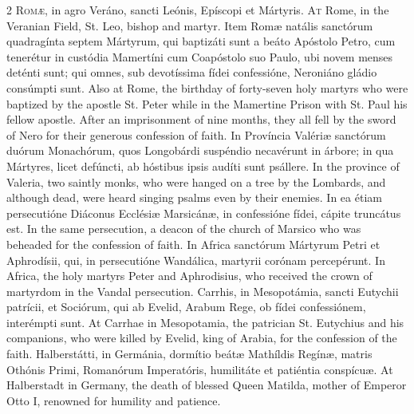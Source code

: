 \begin{paracol}{2}
\lettrine[lines=2]{R}{omæ,} in agro Veráno, sancti Leónis, Epíscopi 
 et Mártyris.
\switchcolumn
{}
\lettrine[lines=2]{A}{t} Rome, in the Veranian Field, St. Leo, bishop and martyr.
\switchcolumn*
{}
Item Romæ natális sanctórum quadragínta septem 
 Mártyrum, qui baptizáti sunt a beáto Apóstolo Petro, cum tenerétur in 
 custódia Mamertíni cum Coapóstolo suo Paulo, ubi novem menses deténti sunt; 
 qui omnes, sub devotíssima fídei confessióne, Neroniáno gládio consúmpti 
 sunt.
\switchcolumn
{}
Also at Rome, the birthday of forty-seven holy martyrs who were baptized by 
 the apostle St. Peter while in the Mamertine Prison with St. Paul his fellow 
 apostle. After an imprisonment of nine months, they all fell by the 
 sword of Nero for their generous confession of faith.
\switchcolumn*
{}
In Província Valériæ sanctórum duórum 
 Monachórum, quos Longobárdi suspéndio necavérunt in árbore; in qua Mártyres, 
 licet defúncti, ab hóstibus ipsis audíti sunt psállere.
\switchcolumn
{}
In the province of Valeria, two saintly monks, who were hanged on a tree by 
 the Lombards, and although dead, were heard singing psalms even by their 
 enemies.
\switchcolumn*
{}
In ea étiam persecutióne Diáconus Ecclésiæ 
 Marsicánæ, in confessióne fídei, cápite truncátus est.
\switchcolumn
{}
In the same persecution, a deacon of the church of Marsico who was beheaded 
 for the confession of faith.
\switchcolumn*
{}
In Africa sanctórum Mártyrum Petri et Aphrodísii, qui, in persecutióne 
 Wandálica, martyrii corónam percepérunt.
\switchcolumn
{}
In Africa, the holy martyrs Peter and Aphrodisius, who received the crown of 
 martyrdom in the Vandal persecution.
\switchcolumn*
{}
Carrhis, in Mesopotámia, sancti Eutychii patrícii, et Sociórum, qui ab 
 Evelid, Arabum Rege, ob fídei confessiónem, interémpti sunt.
\switchcolumn
{}
At Carrhae in Mesopotamia, the patrician St. Eutychius and his companions, 
 who were killed by Evelid, king of Arabia, for the confession of the faith.
\switchcolumn*
{}
Halberstátti, in Germánia, dormítio beátæ 
 Mathíldis Regínæ, matris Othónis Primi, Romanórum Imperatóris, humilitáte et 
 patiéntia conspícuæ.
\switchcolumn
{}
At Halberstadt in Germany, the death of blessed Queen Matilda, mother of 
 Emperor Otto I, renowned for humility and patience.
\switchcolumn*
{}
\end{paracol}


